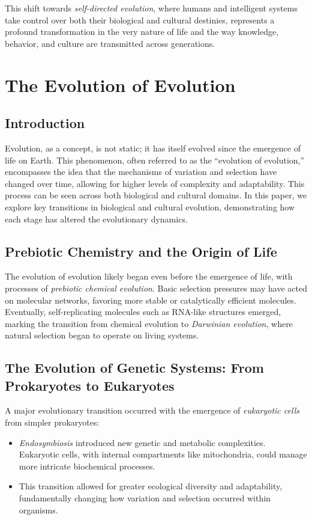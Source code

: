 \documentclass[10pt,titlepage]{book}
\begin{document}
This shift towards \textit{self-directed evolution}, where humans and intelligent systems take control over both their biological and cultural destinies, represents a profound transformation in the very nature of life and the way knowledge, behavior, and culture are transmitted across generations.


\chapter{The Evolution of Evolution}

\section{Introduction}

Evolution, as a concept, is not static; it has itself evolved since the emergence of life on Earth. This phenomenon, often referred to as the ``evolution of evolution,'' encompasses the idea that the mechanisms of variation and selection have changed over time, allowing for higher levels of complexity and adaptability. This process can be seen across both biological and cultural domains. In this paper, we explore key transitions in biological and cultural evolution, demonstrating how each stage has altered the evolutionary dynamics.

\section{Prebiotic Chemistry and the Origin of Life}

The evolution of evolution likely began even before the emergence of life, with processes of \textit{prebiotic chemical evolution}. Basic selection pressures may have acted on molecular networks, favoring more stable or catalytically efficient molecules. Eventually, self-replicating molecules such as RNA-like structures emerged, marking the transition from chemical evolution to \textit{Darwinian evolution}, where natural selection began to operate on living systems.

\section{The Evolution of Genetic Systems: From Prokaryotes to Eukaryotes}

A major evolutionary transition occurred with the emergence of \textit{eukaryotic cells} from simpler prokaryotes:
\begin{itemize}
    \item \textit{Endosymbiosis} introduced new genetic and metabolic complexities. Eukaryotic cells, with internal compartments like mitochondria, could manage more intricate biochemical processes.
    \item This transition allowed for greater ecological diversity and adaptability, fundamentally changing how variation and selection occurred within organisms.
\end{itemize}
\end{document}
